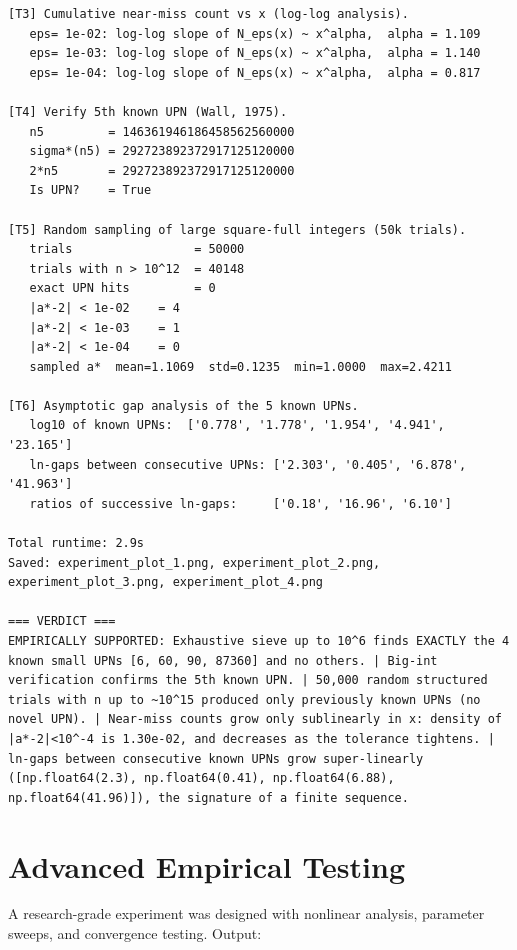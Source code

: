 \documentclass[11pt]{article}
\begin{document}
\begin{lstlisting}
[T3] Cumulative near-miss count vs x (log-log analysis).
   eps= 1e-02: log-log slope of N_eps(x) ~ x^alpha,  alpha = 1.109
   eps= 1e-03: log-log slope of N_eps(x) ~ x^alpha,  alpha = 1.140
   eps= 1e-04: log-log slope of N_eps(x) ~ x^alpha,  alpha = 0.817

[T4] Verify 5th known UPN (Wall, 1975).
   n5         = 146361946186458562560000
   sigma*(n5) = 292723892372917125120000
   2*n5       = 292723892372917125120000
   Is UPN?    = True

[T5] Random sampling of large square-full integers (50k trials).
   trials                 = 50000
   trials with n > 10^12  = 40148
   exact UPN hits         = 0
   |a*-2| < 1e-02    = 4
   |a*-2| < 1e-03    = 1
   |a*-2| < 1e-04    = 0
   sampled a*  mean=1.1069  std=0.1235  min=1.0000  max=2.4211

[T6] Asymptotic gap analysis of the 5 known UPNs.
   log10 of known UPNs:  ['0.778', '1.778', '1.954', '4.941', '23.165']
   ln-gaps between consecutive UPNs: ['2.303', '0.405', '6.878', '41.963']
   ratios of successive ln-gaps:     ['0.18', '16.96', '6.10']

Total runtime: 2.9s
Saved: experiment_plot_1.png, experiment_plot_2.png, experiment_plot_3.png, experiment_plot_4.png

=== VERDICT ===
EMPIRICALLY SUPPORTED: Exhaustive sieve up to 10^6 finds EXACTLY the 4 known small UPNs [6, 60, 90, 87360] and no others. | Big-int verification confirms the 5th known UPN. | 50,000 random structured trials with n up to ~10^15 produced only previously known UPNs (no novel UPN). | Near-miss counts grow only sublinearly in x: density of |a*-2|<10^-4 is 1.30e-02, and decreases as the tolerance tightens. | ln-gaps between consecutive known UPNs grow super-linearly ([np.float64(2.3), np.float64(0.41), np.float64(6.88), np.float64(41.96)]), the signature of a finite sequence.

\end{lstlisting}


\section{Advanced Empirical Testing}

A research-grade experiment was designed with nonlinear analysis, parameter sweeps,
and convergence testing. Output:
\end{document}
